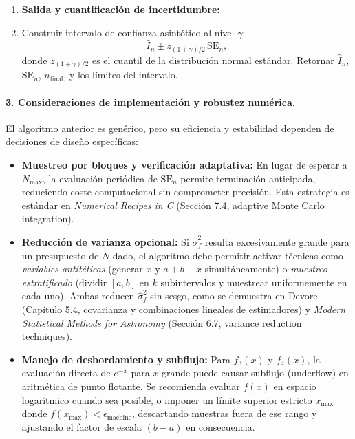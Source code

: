 \documentclass[12pt]{article}
\begin{document}
\begin{enumerate}
\item \textbf{Salida y cuantificación de incertidumbre:}
\item Construir intervalo de confianza asintótico al nivel $\gamma$: 
$$
\hat{I}_n \pm z_{(1+\gamma)/2} \, \text{SE}_n,
$$
donde $z_{(1+\gamma)/2}$ es el cuantil de la distribución normal estándar. Retornar $\hat{I}_n$, $\text{SE}_n$, $n_{\text{final}}$, y los límites del intervalo.
\end{enumerate}

\paragraph{3. Consideraciones de implementación y robustez numérica.}
El algoritmo anterior es genérico, pero su eficiencia y estabilidad dependen de decisiones de diseño específicas:
\begin{itemize}
\item \textbf{Muestreo por bloques y verificación adaptativa:} En lugar de esperar a $N_{\max}$, la evaluación periódica de $\text{SE}_n$ permite terminación anticipada, reduciendo coste computacional sin comprometer precisión. Esta estrategia es estándar en \textit{Numerical Recipes in C} (Sección 7.4, adaptive Monte Carlo integration).
\item \textbf{Reducción de varianza opcional:} Si $\hat{\sigma}^2_f$ resulta excesivamente grande para un presupuesto de $N$ dado, el algoritmo debe permitir activar técnicas como \textit{variables antitéticas} (generar $x$ y $a+b-x$ simultáneamente) o \textit{muestreo estratificado} (dividir $[a,b]$ en $k$ subintervalos y muestrear uniformemente en cada uno). Ambas reducen $\hat{\sigma}^2_f$ sin sesgo, como se demuestra en Devore (Capítulo 5.4, covarianza y combinaciones lineales de estimadores) y \textit{Modern Statistical Methods for Astronomy} (Sección 6.7, variance reduction techniques).
\item \textbf{Manejo de desbordamiento y subflujo:} Para $f_3(x)$ y $f_4(x)$, la evaluación directa de $e^{-x}$ para $x$ grande puede causar subflujo (underflow) en aritmética de punto flotante. Se recomienda evaluar $f(x)$ en espacio logarítmico cuando sea posible, o imponer un límite superior estricto $x_{\text{max}}$ donde $f(x_{\text{max}}) < \epsilon_{\text{machine}}$, descartando muestras fuera de ese rango y ajustando el factor de escala $(b-a)$ en consecuencia.
\end{itemize}
\end{document}
